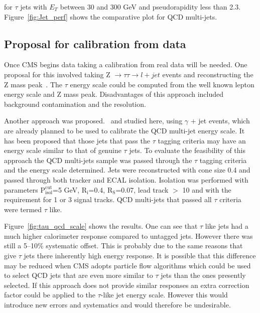 for $\tau$ jets with $E_{T}$ between 30 and 300 GeV and pseudorapidity less than 2.3. Figure~\ref{fig:Jet_perf} shows the comparative plot for QCD multi-jets.

\subsection{Proposal for calibration from data}




Once CMS begins data taking a calibration from real data will be needed. One proposal for this involved taking Z $\rightarrow \tau \tau \rightarrow l + jet$ events and reconstructing the Z mass peak~\cite{CMS_TDR_PHYS_vol1}. The $\tau$ energy scale could be computed from the well known lepton energy scale and Z mass peak. Disadvantages of this approach included background contamination and the \MET resolution.

Another approach was proposed.~\cite{CMS_TDR_PHYS_vol1, citeulike:800614} and studied here, using $\gamma$ + jet events, which are already planned to be used to calibrate the QCD multi-jet energy scale. It has been proposed that those jets that pass the $\tau$ tagging criteria may have an energy scale similar to that of genuine $\tau$ jets. To evaluate the feasibility of this approach the QCD multi-jets sample was passed through the $\tau$ tagging criteria and the energy scale determined. Jets were reconstructed with cone size 0.4 and passed through both tracker and ECAL isolation. Isolation was performed with parameters $\mathrm{P_{isol}^{cut}}$=5 GeV, $\mathrm{R_{i}}$=0.4, $\mathrm{R_{S}}$=0.07, lead track \PT $>$ 10 \GeVc and with the requirement for 1 or 3 signal tracks. QCD multi-jets that passed all $\tau$ criteria were termed $\tau$ like. 

Figure~\ref{fig:tau_qcd_scale} shows the results. One can see that $\tau$ like jets had a much higher calorimeter response compared to untagged jets. However there was still a 5--10\% systematic offset. This is probably due to the same reasons that give $\tau$ jets there inherently high energy response. It is possible that this difference may be reduced when CMS adopts particle flow algorithms which could be used to select QCD jets that are even more similar to $\tau$ jets than the ones presently selected. If this approach does not provide similar responses an extra correction factor could be applied to the $\tau$-like jet energy scale. However this would introduce new errors and systematics and would therefore be undesirable.

